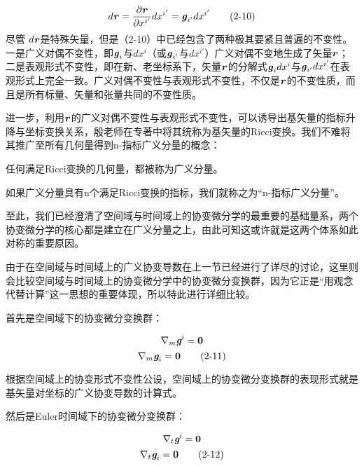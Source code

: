 \documentclass[UTF8]{ctexart}
\begin{document}
\begin{equation*}
    d\textbf{\textit{r}}=\frac{\partial \textbf{\textit{r}}}{\partial x^{i'}} dx^{i'}=
    \textbf{\textit{g}}_{i'} dx^{i'}
    \tag{2-10}
\end{equation*}
尽管 $d\textbf{\textit{r}}$是特殊矢量，但是（2-10）中已经包含了两种极其要紧且普遍的不变性。一是广义对偶不变性，即$\textbf{\textit{g}}_i$与$dx^i$（或$\textbf{\textit{g}}_{i'}$与$dx^{i'}$）广义对偶不变地生成了矢量$\textbf{\textit{r}}$；二是表观形式不变性，即在新、老坐标系下，矢量$\textbf{\textit{r}}$的分解式$\textbf{\textit{g}}_i dx^i$与$\textbf{\textit{g}}_{i'} dx^{i'}$在表观形式上完全一致。广义对偶不变性与表观形式不变性，不仅是$\textbf{\textit{r}}$的不变性质，而且是所有标量、矢量和张量共同的不变性质。\par
进一步，利用$\textbf{\textit{r}}$的广义对偶不变性与表观形式不变性，可以诱导出基矢量的指标升降与坐标变换关系，殷老师在专著中将其统称为基矢量的Ricci变换。我们不难将其推广至所有几何量得到n-指标广义分量的概念：\par
任何满足Ricci变换的几何量，都被称为广义分量。\par
如果广义分量具有n个满足Ricci变换的指标，我们就称之为“n-指标广义分量”。\par
至此，我们已经澄清了空间域与时间域上的协变微分学的最重要的基础量系，两个协变微分学的核心都是建立在广义分量之上，由此可知这或许就是这两个体系如此对称的重要原因。\par
由于在空间域与时间域上的广义协变导数在上一节已经进行了详尽的讨论，这里则会比较空间域与时间域上的协变微分学中的协变微分变换群，因为它正是“用观念代替计算”这一思想的重要体现，所以特此进行详细比较。\par
首先是空间域下的协变微分变换群：\par
\begin{equation*}
    \nabla_m\textit{\textbf{g}}^i=\textbf{0}
\end{equation*}
\begin{equation*}
    \nabla_m\textit{\textbf{g}}_i=\textbf{0}
    \tag{2-11}
\end{equation*}
\par
根据空间域上的协变形式不变性公设，空间域上的协变微分变换群的表现形式就是基矢量对坐标的广义协变导数的计算式。\par
然后是Euler时间域下的协变微分变换群：\par
\begin{equation*}
    \nabla_t\textit{\textbf{g}}^i=\textbf{0}
\end{equation*}
\begin{equation*}
    \nabla_t\textit{\textbf{g}}_i=\textbf{0}
    \tag{2-12}
\end{equation*}
\end{document}

